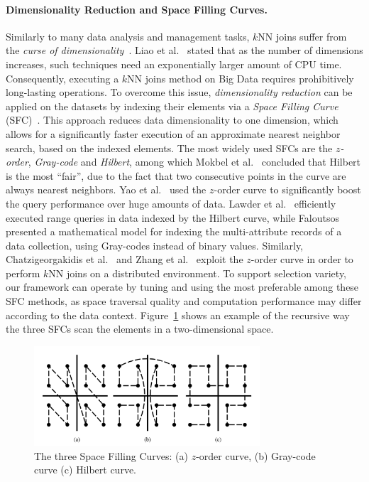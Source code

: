 \paragraph{Dimensionality Reduction and Space Filling Curves.} Similarly to many data analysis and management tasks, $k$NN joins suffer from the \textit{curse of dimensionality}~\cite{berchtold1998his}. Liao et al.~\cite{liao2001SFC} stated that as the number of dimensions increases, such techniques need an exponentially larger amount of CPU time. Consequently, executing a $k$NN joins method on Big Data requires prohibitively long-lasting operations. To overcome this issue, \textit{dimensionality reduction} can be applied on the datasets by indexing their elements via a \textit{Space Filling Curve} (SFC)~\cite{sagan2012space}. This approach reduces data dimensionality to one dimension, which allows for a significantly faster execution of an approximate nearest neighbor search, based on the indexed elements. The most widely used SFCs are the \textit{$z$-order}, \textit{Gray-code} and \textit{Hilbert}, among which Mokbel et al.~\cite{mokbel2002pms} concluded that Hilbert is the most ``fair'', due to the fact that two consecutive points in the curve are always nearest neighbors. Yao et al.~\cite{yao2010knn} used the $z$-order curve to significantly boost the query performance over huge amounts of data. Lawder et al.~\cite{lawder2001qmd} efficiently executed range queries in data indexed by the Hilbert curve, while Faloutsos~\cite{faloutsos1986mhu} presented a mathematical model for indexing the multi-attribute records of a data collection, using Gray-codes instead of binary values. Similarly, Chatzigeorgakidis et al.~\cite{chatzigeorgakidis2015mapreduce} and Zhang et al.~\cite{zhang2012epk} exploit the $z$-order curve in order to perform $k$NN joins on a distributed environment. To support selection variety, our framework can operate by tuning and using the most preferable among these SFC methods, as space traversal quality and computation performance may differ according to the data context. Figure~\ref{figure1} shows an example of the recursive way the three SFCs scan the elements in a two-dimensional space.

\begin{figure}[tb]
	\centering
	\includegraphics[width=0.75\textwidth]{figures/figure1.png}
	\caption{The three Space Filling Curves: (a) $z$-order curve, (b) Gray-code curve (c) Hilbert curve.}
	\label{figure1}
\end{figure}

